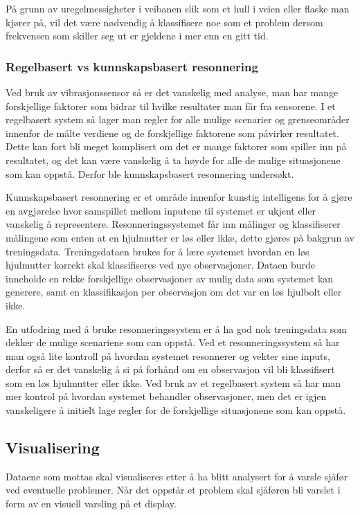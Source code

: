 På grunn av uregelmessigheter i veibanen slik som et hull i veien eller flaske 
man kjører på, vil det være nødvendig å klassifisere noe som et problem dersom 
frekvensen som skiller seg ut er gjeldene i mer enn en gitt tid.

\subsubsection{Regelbasert vs kunnskapsbasert resonnering}
Ved bruk av vibrasjonssensor så er det vanskelig med analyse, man har mange forskjellige faktorer som bidrar til hvilke resultater man får fra sensorene.
I et regelbasert system så lager man regler for alle mulige scenarier og grenseområder innenfor de målte verdiene og de forskjellige faktorene som påvirker resultatet. 
Dette kan fort bli meget komplisert om det er mange faktorer som spiller inn på resultatet, og det kan være vanskelig å ta høyde for alle de mulige situasjonene som kan oppstå.
Derfor ble kunnskapsbasert resonnering undersøkt. 


Kunnskapsbasert resonnering er et område innenfor kunstig intelligens for å gjøre en avgjørelse hvor samspillet mellom inputene til systemet er ukjent eller vanskelig å representere. Resonneringssystemet får inn målinger og klassifiserer målingene som enten at en hjulmutter er løs eller ikke, dette gjøres på bakgrun av treningsdata. Treningsdataen brukes for å lære systemet hvordan en løs hjulmutter korrekt skal klassifiseres ved nye observasjoner. Dataen burde inneholde en rekke forskjellige observasjoner av mulig data som systemet kan generere, samt en klassifikasjon per observasjon om det var en løs hjulbolt eller ikke.

En utfodring med å bruke resonneringssystem er å ha god nok treningsdata som dekker de mulige scenariene som can oppstå.
Ved et resonneringssystem så har man også lite kontroll på hvordan systemet resonnerer og vekter sine inputs, derfor så er det vanskelig å si på forhånd om en observasjon vil bli klassifisert som en løs hjulmutter eller ikke. Ved bruk av et regelbasert system så har man mer kontrol på hvordan systemet behandler observasjoner, men det er igjen vanskeligere å initielt lage regler for de forskjellige situasjonene som kan oppstå.


\subsection{Visualisering}
Dataene som mottas skal visualiseres etter å ha blitt analysert for å varsle 
sjåfør ved eventuelle problemer. Når det oppstår et problem skal sjåføren bli 
varslet i form av en visuell varsling på et display.

